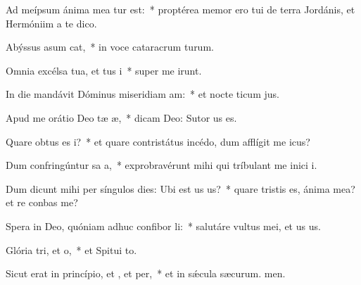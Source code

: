 \item Ad meípsum ánima mea tur est:~* proptérea memor ero tui de terra Jordánis, et Hermóniim a te dico.
\item Abýssus asum cat,~* in voce cataracrum turum.
\item Omnia excélsa tua, et tus i~* super me irunt.
\item In die mandávit Dóminus miseridiam am:~* et nocte ticum jus.
\item Apud me orátio Deo tæ æ,~* dicam Deo: Sutor us es.
\item Quare obtus es i?~* et quare contristátus incédo, dum afflígit me icus?
\item Dum confringúntur sa a,~* exprobravérunt mihi qui tríbulant me inici i.
\item Dum dicunt mihi per síngulos dies: Ubi est us us?~* quare tristis es, ánima mea? et re conbas me?
\item Spera in Deo, quóniam adhuc confibor li:~* salutáre vultus mei, et us us.
\item Glória tri, et o,~* et Spitui to.
\item Sicut erat in princípio, et , et per,~* et in sǽcula sæcurum. men.
